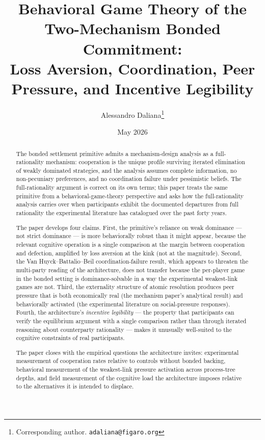\documentclass[11pt,a4paper]{article}
\title{%
  Behavioral Game Theory of the Two-Mechanism Bonded Commitment:\\
  Loss Aversion, Coordination, Peer Pressure, and Incentive Legibility%
}
\author{
  Alessandro Daliana\thanks{Corresponding author. \texttt{adaliana@figaro.org}}
}
\date{May 2026}
\theoremstyle{definition}
\theoremstyle{remark}
\begin{document}
\maketitle

\begin{abstract}
The bonded settlement primitive admits a mechanism-design
analysis as a full-rationality mechanism: cooperation is the
unique profile surviving iterated elimination of weakly dominated
strategies, and the analysis assumes complete information, no
non-pecuniary preferences, and no coordination failure under
pessimistic beliefs. The full-rationality argument is correct on its
own terms; this paper treats the same primitive from a
behavioral-game-theory perspective and asks how the
full-rationality analysis carries over when participants exhibit
the documented departures from full rationality the experimental
literature has catalogued over the past forty years.

The paper develops four claims. First, the primitive's reliance on
weak dominance --- not strict dominance --- is more behaviorally robust
than it might appear, because the relevant cognitive operation is a
single comparison at the margin between cooperation and defection,
amplified by loss aversion at the kink (not at the magnitude). Second,
the Van Huyck--Battalio--Beil coordination-failure result, which
appears to threaten the multi-party reading of the architecture, does
not transfer because the per-player game in the bonded setting is
dominance-solvable in a way the experimental weakest-link games are
not. Third, the externality structure of atomic resolution produces
peer pressure that is both economically real (the mechanism paper's
analytical result) and behaviorally activated (the experimental
literature on social-pressure responses). Fourth, the architecture's
\emph{incentive legibility} --- the property that participants can
verify the equilibrium argument with a single comparison rather than
through iterated reasoning about counterparty rationality --- makes it
unusually well-suited to the cognitive constraints of real
participants.

The paper closes with the empirical questions the architecture
invites: experimental measurement of cooperation rates relative to
controls without bonded backing, behavioral measurement of the
weakest-link pressure activation across process-tree depths, and
field measurement of the cognitive load the architecture imposes
relative to the alternatives it is intended to displace.
\end{abstract}
\end{document}
